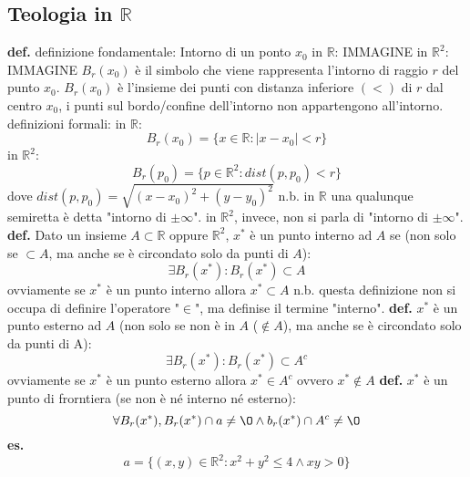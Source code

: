 \subsection*{Teologia in $\mathbb{R}$}
\textbf{def.} definizione fondamentale: Intorno di un ponto $x_0$
\newline
in $\mathbb{R}$: IMMAGINE
\newline
in $\mathbb{R}^2$: IMMAGINE
\newline
$B_r(x_0)$ è il simbolo che viene rappresenta l'intorno di raggio $r$ del punto $x_0$.
$B_r(x_0)$ è l'insieme dei punti con distanza inferiore $(<)$ di $r$ dal centro $x_0$, i punti sul bordo/confine dell'intorno non appartengono all'intorno.
\newline
definizioni formali:
\newline
in $\mathbb{R}$:
\[
    B_r(x_0) = \{x\in\mathbb{R}:|x-x_0|<r\}
\] 
\newline
in $\mathbb{R}^2$: 
\[
    B_r(p_0) = \{p\in\mathbb{R}^2:dist(p,p_0)<r\}
\]
dove $dist(p,p_0) = \sqrt{(x-x_0)^2+(y-y_0)^2}$
\newline
n.b. in $\mathbb{R}$ una qualunque semiretta è detta "intorno di $\pm\infty$". in $\mathbb{R}^2$, invece, non si parla di "intorno di $\pm\infty$".
\newline
\newline
\textbf{def.} Dato un insieme $A\subset \mathbb{R}$ oppure $\mathbb{R}^2$, $x^*$ è un punto interno ad $A$ se (non solo se $\subset A$, ma anche se è circondato solo da punti di $A$):
\[
    \exists B_r(x^*):B_r(x^*)\subset A
\] 
ovviamente se $x^*$ è un punto interno allora $x^*\subset A$
\newline
n.b. questa definizione non si occupa di definire l'operatore "$\in$", ma definise il termine "interno".
\newline
\newline
\textbf{def.} $x^*$ è un punto esterno ad $A$ (non solo se non è in $A$ ($\notin A$), ma anche se è circondato solo da punti di A):
\[
    \exists B_r(x^*):B_r(x^*)\subset A^c
\] 
ovviamente se $x^*$ è un punto esterno allora $x^*\in A^c$ ovvero $x^*\notin A$
\newline
\textbf{def.} $x^*$ è un punto di frorntiera (se non è né interno né esterno):
\[
    \forall B_r(x^*), B_r(x^*) \cap a\neq\O \land b_r(x^*) \cap A^c \neq \O
\] 
\textbf{es.}
\[
    a = \{(x,y)\in \mathbb{R}^2 : x^2+y^2 \leq 4 \land xy >0\}
\] 
\begin{figure}[ht]
    \centering
\end{figure}
